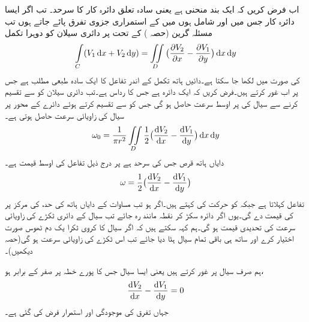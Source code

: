اب فرض کریں کہ  ایک بند منحنی ہے یعنی سادہ تعلق دائرہ کار  کا سرحد۔ تب اگر ایسا دائرہ کار جس میں  اور  شامل ہوں  میں  کے استمراری جزوی تفرق پائے جاتے ہوں  تب مسئلہ گرین (حصہ ) کے تحت  پر دائری سیلان کو دوہرا تکمل
\begin{align}
\int\limits_C (V_1\dif x+V_2\dif y)=\iint\limits_D \big(\frac{\partial V_2}{\partial x}-\frac{\partial V_1}{\partial y}\big)\dif x\dif y
\end{align}
کی صورت میں لکھا جا سکتا ہے۔دائیں ہاتھ تکمل کے اندر تفاعل کا ایک سادہ طبعی مطلب ہے جس پر اب غور کرتے ہیں۔فرض کریں کہ  ایک دائرہ ہے جس کا  رداس   ہے۔تب دائری سیلان کو  سے تقسیم کرنے سے  سیال کی  پر اوسط سرعت حاصل ہو گی  جس کو  سے تقسیم کرتے ہوئے  دائرے کے  محور پر سیال کی زاویائی سرعت  حاصل ہوتی ہے۔
\begin{align}\label{مساوات_مخفی_قوہ_گرداب_الف}
\omega_0=\frac{1}{\pi r^2}\iint\limits_D \frac{1}{2}\big(\frac{\dif V_2}{\dif x}-\frac{\dif V_1}{\dif y}\big)\dif x\dif y
\end{align}
دایاں ہاتھ قرص  جس کی سرحد  ہے  پر درج ذیل تفاعل کی اوسط قیمت ہے۔
\begin{align}
\omega=\frac{1}{2}\big(\frac{\dif V_2}{\dif x}-\frac{\dif V_1}{\dif y}\big)
\end{align} 
تفاعل   کہلاتا ہے جبکہ  کو حرکت کی  کہتے ہیں۔اگر  ہو تب مساوات  کے دایاں ہاتھ کی حد،  کی مرکز پر   کی قیمت دے گی۔یوں اگر دائرہ  سکڑ کر نقطہ  مانند رہ جائے تب سیال کے دائری ٹکڑے کی زاویائی سرعت کی تحدیدی قیمت   ہو گی۔ہم کہہ سکتے ہیں کہ اگر سیال کا کروی ٹکرا یک دم ٹھوس صورت اختیار کرے اور ساتھ ہی باقی تمام سیال ہٹا دیا جائے تب اس ٹکڑے کی زاویائی سرعت   ہو گی(حصہ  دیکھیں)۔

ہم صرف  سیال پر غور کرتے ہیں یعنی ایسا سیال جس کا  پورے خطہ   پر صفر کے برابر ہو،
\begin{align*}
\frac{\dif V_2}{\dif x}-\frac{\dif V_1}{\dif y}=0
\end{align*} 
جہاں تفرق کی موجودگی اور استمرار فرض کی گئی ہے۔

